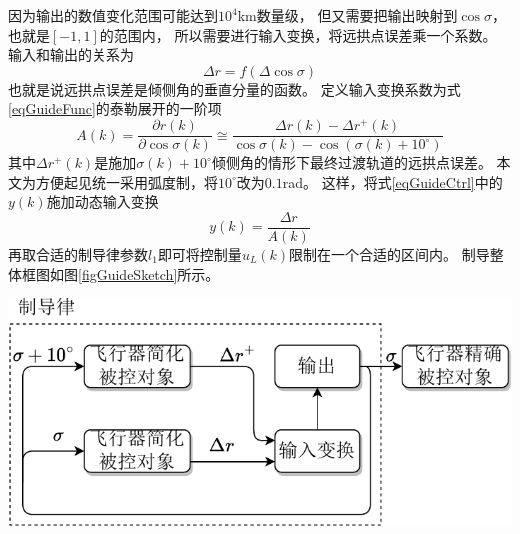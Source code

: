 因为输出的数值变化范围可能达到$10^4$km数量级，
但又需要把输出映射到$\cos\sigma$，也就是$[-1,1]$的范围内，
所以需要进行输入变换，将远拱点误差乘一个系数。
输入和输出的关系为
\begin{equation}
    \Delta r = f(\Delta\cos\sigma) \label{eqGuideFunc}
\end{equation}
也就是说远拱点误差是倾侧角的垂直分量的函数。
定义输入变换系数为式\eqref{eqGuideFunc}的泰勒展开的一阶项
\begin{equation*}
    A(k) = \frac{\partial r(k)}{\partial\cos\sigma(k)}
    \cong \frac{\Delta r(k) - \Delta r^+(k)}{\cos\sigma(k) - \cos(\sigma(k)+10^\circ)}
\end{equation*}
其中$\Delta r^+(k)$是施加$\sigma(k)+10^\circ$倾侧角的情形下最终过渡轨道的远拱点误差。
本文为方便起见统一采用弧度制，将$10^\circ$改为$0.1$rad。
这样，将式\eqref{eqGuideCtrl}中的$y(k)$施加动态输入变换
\[y(k) = \frac{\Delta r}{A(k)}\]
再取合适的制导律参数$l_1$即可将控制量$u_L(k)$限制在一个合适的区间内。
制导整体框图如图\ref{figGuideSketch}所示。
\begin{center}
	\includegraphics[scale=0.7]{GuideSketch.pdf}  \\
	\label{figGuideSketch}
\end{center}

